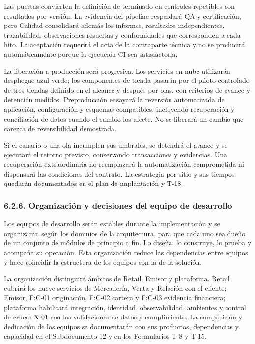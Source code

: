 \documentclass[11pt]{article}
\begin{document}
Las puertas convierten la definición de terminado en controles
repetibles con resultados por versión. La evidencia del pipeline
respaldará QA y certificación, pero Calidad consolidará además los
informes, resultados independientes, trazabilidad, observaciones
resueltas y conformidades que corresponden a cada hito. La aceptación
requerirá el acta de la contraparte técnica y no se producirá
automáticamente porque la ejecución CI sea satisfactoria.

La liberación a producción será progresiva. Los servicios en nube
utilizarán despliegue azul-verde; los componentes de tienda pasarán por
el piloto controlado de tres tiendas definido en el alcance y después
por olas, con criterios de avance y detención medidos. Preproducción
ensayará la reversión automatizada de aplicación, configuración y
esquemas compatibles, incluyendo recuperación y conciliación de datos
cuando el cambio los afecte. No se liberará un cambio que carezca de
reversibilidad demostrada.

Si el canario o una ola incumplen sus umbrales, se detendrá el avance y
se ejecutará el retorno previsto, conservando transacciones y
evidencias. Una recuperación extraordinaria no reemplazará la
automatización comprometida ni dispensará las condiciones del contrato.
La estrategia por sitio y sus tiempos quedarán documentados en el plan
de implantación y T-18.

\subsubsection{6.2.6. Organización y decisiones del equipo de desarrollo}\label{6-2-6-organizacion-y-decisiones-del-equipo-de-desarrollo}

Los equipos de desarrollo serán estables durante la implementación y se organizarán según los dominios de la arquitectura, para que cada uno sea dueño de un conjunto de módulos de principio a fin. Lo diseña, lo construye, lo prueba y acompaña su operación. Esta organización reduce las dependencias entre equipos y hace coincidir la estructura de los equipos con la de la solución.

La organización distinguirá ámbitos de Retail, Emisor y plataforma.
Retail cubrirá los nueve servicios de Mercadería, Venta y Relación con
el cliente; Emisor, F:C-01 originación, F:C-02 cartera y F:C-03
evidencia financiera; plataforma habilitará integración, identidad,
observabilidad, ambientes y control de cruces X-01 con las validaciones
de datos y cumplimiento. La composición y dedicación de los equipos se
documentarán con sus productos, dependencias y capacidad en el
Subdocumento 12 y en los Formularios T-8 y T-15.
\end{document}
